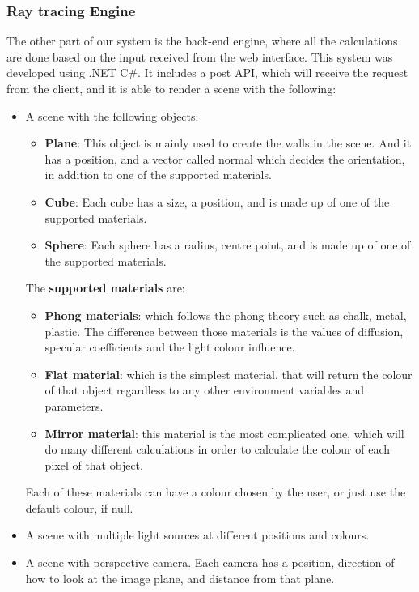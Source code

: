 \documentclass[a4paper]{article}
\begin{document}
	\subsubsection{Ray tracing Engine}
	The other part of our system is the back-end engine, where all the calculations are done based on the input received from the web interface. This system was developed using .NET C\#. It includes a post API, which will receive the request from the client, and it is able to render a scene with the following:
	\begin{itemize}
		\item A scene with the following objects:
		\begin{itemize}
			\item \textbf{Plane}: This object is mainly used to create the walls in the scene. And it has a position, and a vector called normal which decides the orientation, in addition to one of the supported materials.
			\item \textbf{Cube}: Each cube has a size, a position, and is made up of one of the supported materials.
			\item \textbf{Sphere}: Each sphere has a radius, centre point, and is made up of one of the supported materials.
		\end{itemize}
		The  \textbf{supported materials} are:
		\begin{itemize}
			\item \textbf{Phong materials}:  which follows the phong theory such as chalk, metal, plastic. The difference between those materials is the values of diffusion, specular coefficients and the light colour influence.
			\item \textbf{Flat material}: which is the simplest material, that will return the colour of that object regardless to any other environment variables and parameters.
			\item \textbf {Mirror material}: this material is the most complicated one, which will do many different calculations in order to calculate the colour of each pixel of that object.
		\end{itemize}
		Each of these materials can have a colour chosen by the user, or just use the default colour, if null.
		\item A scene with multiple light sources at different positions and colours.
		\item A scene with perspective camera. Each camera has a position, direction of how to look at the image plane, and distance from that plane.
	\end{itemize}
\end{document}
